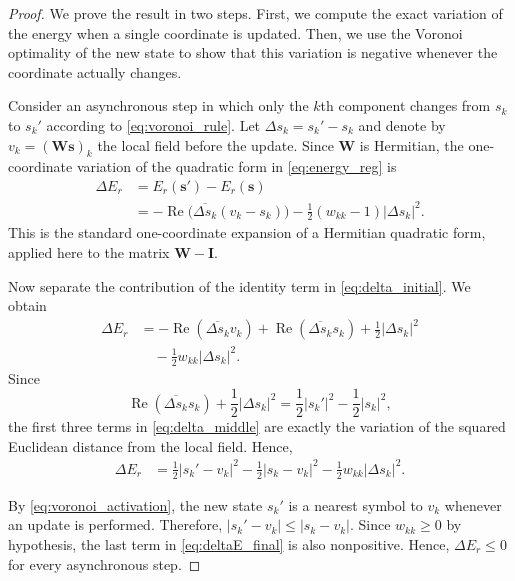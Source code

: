 \documentclass[10pt,journal,letterpaper]{IEEEtran}
\begin{document}
\begin{proof}
We prove the result in two steps. First, we compute the exact variation of the
energy when a single coordinate is updated. Then, we use the Voronoi
optimality of the new state to show that this variation is negative whenever
the coordinate actually changes.

Consider an asynchronous step in which only the $k$th component changes from
$s_k$ to $s_k'$ according to \eqref{eq:voronoi_rule}. Let
$\Delta s_k=s_k'-s_k$ and denote by
$v_k=(\boldsymbol{W}\boldsymbol{s})_k$ the local field before the update.
Since $\boldsymbol{W}$ is Hermitian, the one-coordinate variation of the
quadratic form in \eqref{eq:energy_reg} is
\begin{align}
\Delta E_r
&=E_r(\boldsymbol{s}')-E_r(\boldsymbol{s}) \nonumber\\
&=-\operatorname{Re}\bigl(\overline{\Delta s_k}(v_k-s_k)\bigr)
  -\frac{1}{2}(w_{kk}-1)|\Delta s_k|^2 .
\label{eq:delta_initial}
\end{align}
This is the standard one-coordinate expansion of a Hermitian quadratic form,
applied here to the matrix $\boldsymbol{W}-\boldsymbol{I}$.

Now separate the contribution of the identity term in
\eqref{eq:delta_initial}. We obtain
\begin{align}
\Delta E_r
&=-\operatorname{Re}(\overline{\Delta s_k}v_k)
  +\operatorname{Re}(\overline{\Delta s_k}s_k)
  +\frac{1}{2}|\Delta s_k|^2 \nonumber\\
&\quad -\frac{1}{2}w_{kk}|\Delta s_k|^2 .
\label{eq:delta_middle}
\end{align}
Since
\begin{equation}
\operatorname{Re}(\overline{\Delta s_k}s_k)
 +\frac{1}{2}|\Delta s_k|^2
 =
\frac{1}{2}|s_k'|^2-\frac{1}{2}|s_k|^2 ,
\end{equation}
the first three terms in \eqref{eq:delta_middle} are exactly the variation of
the squared Euclidean distance from the local field. Hence,
\begin{align}
\Delta E_r
&=
\frac{1}{2}|s_k'-v_k|^2
-\frac{1}{2}|s_k-v_k|^2
-\frac{1}{2}w_{kk}|\Delta s_k|^2 .
\label{eq:deltaE_final}
\end{align}

By \eqref{eq:voronoi_activation}, the new state $s_k'$ is a nearest symbol to
$v_k$ whenever an update is performed. Therefore,
$|s_k'-v_k|\le |s_k-v_k|$. Since $w_{kk}\ge0$ by hypothesis, the last term in
\eqref{eq:deltaE_final} is also nonpositive. Hence, $\Delta E_r\le0$ for every
asynchronous step.


\end{proof}
\end{document}
